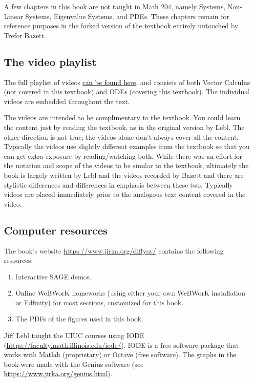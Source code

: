 A few chapters in this book are not taught in Math 204, namely Systems, Non-Linear Systems, Eigenvalue Systems, and PDEs. These chapters remain for reference purposes in the forked version of the textbook entirely untouched by Trefor Bazett. 

\subsection{The video playlist}
The full playlist of videos \href{https://www.youtube.com/playlist?list=PLQ9f-JfDG2WyBPsKFkkfszurhIYeKN6oX}{can be found here}, and consists of both Vector Calculus (not covered in this textbook) and ODEs (covering this textbook). The individual videos are embedded throughout the text. 

The videos are intended to be complimentary to the textbook. You could learn the content just by reading the textbook, as in the original version by Lebl. The other direction is not true; the videos alone don't always
cover all the content. Typically the videos use slightly different examples from the textbook so that you can get extra exposure by reading/watching both. While there was an effort for the notation and scope of the videos to be similar to the textbook, ultimately the book is largely written by Lebl and the videos recorded by Bazett and there are stylistic differences and differences in emphasis between these two. Typically videos are placed immediately prior to the analogous text content covered in the video.



\subsection{Computer resources}

The book's
website \url{https://www.jirka.org/diffyqs/}
contains the following resources:
\begin{enumerate}
\item Interactive SAGE demos.
\item Online WeBWorK homeworks
(using either your own WeBWorK installation or Edfinity)
for most sections, customized for this book.
\item The PDFs of the figures used in this book.
\end{enumerate}

Jiří Lebl taught the UIUC courses using IODE
(\url{https://faculty.math.illinois.edu/iode/}).
IODE is a free software package that
works with Matlab (proprietary) or Octave (free software).
The graphs in the book were made with
the Genius software
(see \url{https://www.jirka.org/genius.html}). 

